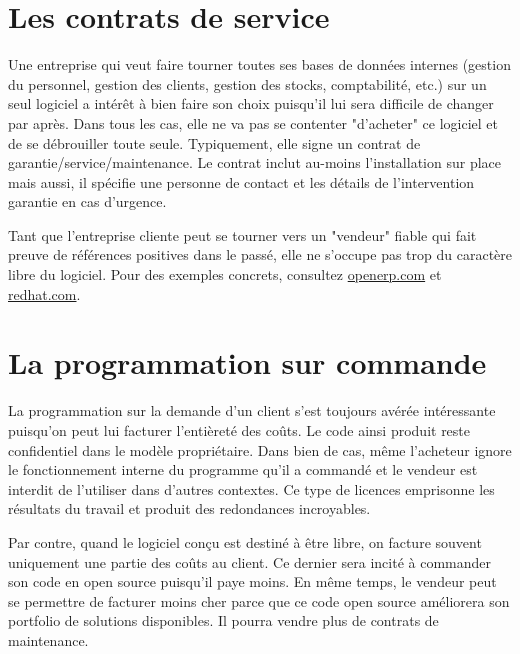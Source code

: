 \section*{Les contrats de service}
Une entreprise qui veut faire tourner toutes ses bases de données internes (gestion du personnel,
gestion des clients, gestion des stocks, comptabilité, etc.) sur un seul logiciel a intérêt à bien faire son choix puisqu'il lui sera difficile de changer par après.%
Dans tous les cas, elle ne va pas se contenter "d'acheter" ce logiciel et de se débrouiller toute seule.
Typiquement, elle signe un contrat de garantie/service/maintenance. %
Le contrat inclut au-moins l'installation sur place mais aussi, il spécifie une personne de contact et les détails de l'intervention garantie en cas d'urgence.

Tant que l'entreprise cliente peut se tourner vers un "vendeur" fiable qui fait preuve de références 
positives dans le passé, elle ne s'occupe pas trop du caractère libre du logiciel. 
Pour des exemples concrets, consultez \url{openerp.com} et \url{redhat.com}.

\section*{La programmation sur commande}
La programmation sur la demande d'un client %
s'est toujours avérée intéressante puisqu'on
peut lui facturer l'entièreté des coûts. Le code ainsi produit reste confidentiel dans le
modèle propriétaire. Dans bien de cas, même l'acheteur ignore le fonctionnement 
interne du programme qu'il a commandé et le vendeur est interdit de l'utiliser dans d'autres contextes.
Ce type de licences emprisonne les résultats du travail et produit des redondances incroyables.

Par contre, quand le logiciel conçu est destiné à être libre, on facture souvent uniquement une partie 
des coûts au client. Ce dernier sera incité à commander son code en open source puisqu'il paye moins. %
En même temps, le vendeur peut se permettre de facturer moins cher parce que ce code open source
améliorera son portfolio de solutions disponibles. Il pourra vendre plus de contrats de maintenance.

